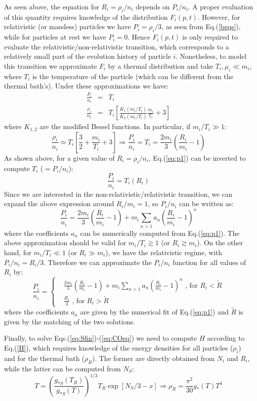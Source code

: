 \documentclass[preprint,notoc]{JHEP3}
\def\be{\begin{equation}}
\def\ee{\end{equation}}
\def\bea{\begin{eqnarray}}
\def\eea{\end{eqnarray}}
\def\To{\Rightarrow}
\begin{document}
As seen above, the equation for $R_i = \rho_i/n_i$ depends on $P_i/n_i$. A proper evaluation of this quantity
requires knowledge of the distribution $F_i(p,t)$. However, for relativistic (or
massless) particles we have $P_i = \rho_i/3$, as seen from Eq.(\ref{beqs}), while for particles at rest we have $P_i = 0$. Hence $F_i(p,t)$ is only 
required to evaluate the relativistic/non-relativistic transition, which corresponds to a relatively small part of the evolution history
of particle $i$. Nonetheless, to model this transition we approximate $F_i$ by a thermal distribution and take $T_i, \mu_i \ll m_i$, where $T_i$ is
the temperature of the particle (which can be different from the thermal bath's). Under these approximations we have:
\bea
\frac{P_i}{n_i} & = & T_i \nonumber \\
\frac{\rho_i}{n_i} & = & T_i \left[ \frac{K_1(m_i/T_i)}{K_2(m_i/T_i)} \frac{m_i}{T_i} + 3 \right] \label{eq:p1}
\eea
where $K_{1,2}$ are the modified Bessel functions. In particular, if $m_i/T_i \gg 1$:
\be
\frac{\rho_i}{n_i} \simeq T_i \left[\frac{3}{2} + \frac{m_i}{T_i}  + 3 \right] \To \frac{P_i}{n_i} = T_i = \frac{2 m_i}{3}\left( \frac{R_i}{m_i} -1 \right)
\ee
As shown above, for a given value of $R_i = \rho_i/n_i$, Eq.(\ref{eq:p1}) can be inverted to compute $T_i$ ($=P_i/n_i$):
\be
\frac{P_i}{n_i} = T_i(R_i)
\ee
Since we are interested in the non-relativistic/relativistic transition, we can expand the above expression around $R_i/m_i = 1$,
so $P_i/n_i$ can be written as:
\be
\frac{P_i}{n_i} = \frac{2 m_i}{3}\left( \frac{R_i}{m_i} -1 \right) + m_i \sum_{n >1} a_n \left(\frac{R_i}{m_i} -1 \right)^n
\ee
where the coefficients $a_n$ can be numerically computed from Eq.(\ref{eq:p1}). The above approximation should be valid for
$m_i/T_i \gtrsim 1$ (or $R_i \gtrsim m_i$). On the other hand, for $m_i/T_i \ll 1$ (or $R_i \gg m_i$), we have the 
relativistic regime, with $P_i/n_i = R_i/3$.
Therefore we can approximate the $P_i/n_i$ function for all values of $R_i$ by:
\be
\frac{P_i}{n_i} = \left\{ \begin{array}{rl}
& \frac{2 m_i}{3}\left( \frac{R_i}{m_i} -1 \right) + m_i \sum_{n >1} a_n \left(\frac{R_i}{m_i} -1 \right)^n  \mbox{ , for $R_i < \tilde{R}$} \\
& \frac{R_i}{3}  \mbox{ , for $R_i > \tilde{R}$} 
\end{array} \right. \label{Pfin}
\ee
where the coefficients $a_n$ are given by the numerical fit of Eq.(\ref{eq:p1}) and $\tilde{R}$ is given by the matching of the two solutions.

Finally, to solve Eqs.(\ref{eq:Sfin})-(\ref{eq:COeq}) we need to compute $H$
according to Eq.(\ref{H}), which requires knowledge of the energy densities for all
particles ($\rho_i$) and for the thermal bath ($\rho_R$). The former are directly obtained from $N_i$ and $R_i$, while the latter can be
 computed from $N_S$:
\be
T = \left(\frac{g_{*S}(T_R)}{g_{*S}(T)}\right)^{1/3} T_R \exp[N_S/3 -x] \To \rho_R = \frac{\pi^2}{30} g_{*}(T) T^4
\ee
\end{document}
